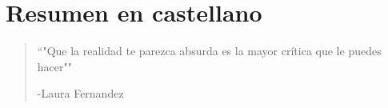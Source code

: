 \chapter{Resumen en castellano}



\begin{quotation}

    \begin{flushright}
    \begin{minipage}[t][5cm][b]{0.5\textwidth}
    { ``"Que la realidad te parezca absurda es la mayor crítica que le puedes hacer""}
    
    \bigskip
    
    -{\small  Laura Fernandez}
    \end{minipage}
    \end{flushright}
    
    \vspace{0.5cm}
\end{quotation}